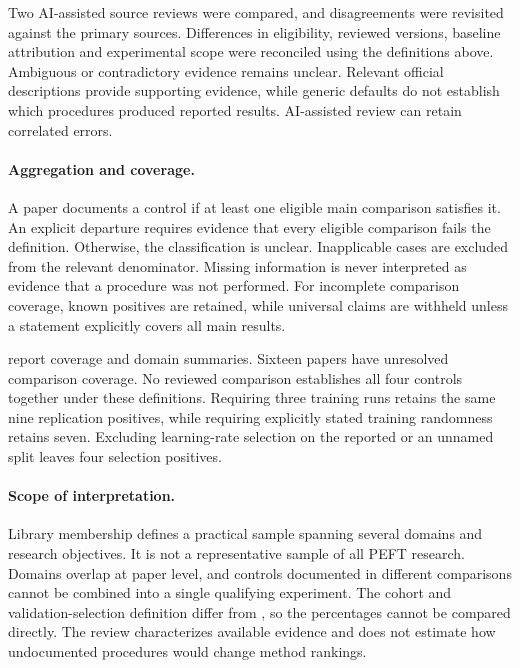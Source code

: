 Two AI-assisted source reviews were compared, and disagreements were revisited against the primary sources.
Differences in eligibility, reviewed versions, baseline attribution and experimental scope were reconciled using the definitions above.
Ambiguous or contradictory evidence remains unclear.
Relevant official descriptions provide supporting evidence, while generic defaults do not establish which procedures produced reported results.
AI-assisted review can retain correlated errors.

\paragraph{Aggregation and coverage.}
A paper documents a control if at least one eligible main comparison satisfies it.
An explicit departure requires evidence that every eligible comparison fails the definition.
Otherwise, the classification is unclear.
Inapplicable cases are excluded from the relevant denominator.
Missing information is never interpreted as evidence that a procedure was not performed.
For incomplete comparison coverage, known positives are retained, while universal claims are withheld unless a statement explicitly covers all main results.

 report coverage and domain summaries.
Sixteen papers have unresolved comparison coverage.
No reviewed comparison establishes all four controls together under these definitions.
Requiring three training runs retains the same nine replication positives, while requiring explicitly stated training randomness retains seven.
Excluding learning-rate selection on the reported or an unnamed split leaves four selection positives.

\paragraph{Scope of interpretation.}
Library membership defines a practical sample spanning several domains and research objectives.
It is not a representative sample of all PEFT research.
Domains overlap at paper level, and controls documented in different comparisons cannot be combined into a single qualifying experiment.
The cohort and validation-selection definition differ from \citet{lee2026learningrate}, so the percentages cannot be compared directly.
The review characterizes available evidence and does not estimate how undocumented procedures would change method rankings.


